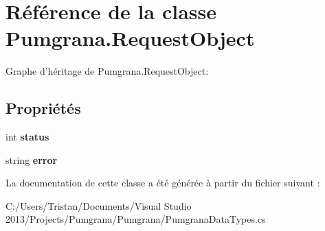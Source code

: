 \hypertarget{class_pumgrana_1_1_request_object}{\section{Référence de la classe Pumgrana.\+Request\+Object}
\label{class_pumgrana_1_1_request_object}
}


Graphe d'héritage de Pumgrana.\+Request\+Object\+:
\subsection*{Propriétés}
\begin{DoxyCompactItemize}
\item 
\hypertarget{class_pumgrana_1_1_request_object_a28ba378bf7aa05b0b4035e47f4f2d422}{int {\bfseries status}}\label{class_pumgrana_1_1_request_object_a28ba378bf7aa05b0b4035e47f4f2d422}

\item 
\hypertarget{class_pumgrana_1_1_request_object_a02d03471281276da38127294fc904f65}{string {\bfseries error}}\label{class_pumgrana_1_1_request_object_a02d03471281276da38127294fc904f65}

\end{DoxyCompactItemize}


La documentation de cette classe a été générée à partir du fichier suivant \+:\begin{DoxyCompactItemize}
\item 
C\+:/\+Users/\+Tristan/\+Documents/\+Visual Studio 2013/\+Projects/\+Pumgrana/\+Pumgrana/Pumgrana\+Data\+Types.\+cs\end{DoxyCompactItemize}
